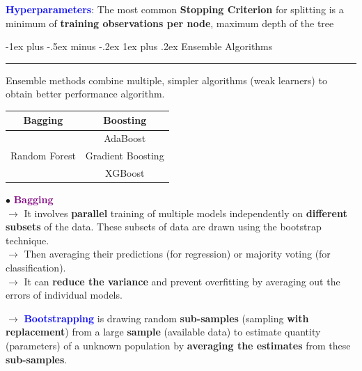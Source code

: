\documentclass[letterpaper, 10.5pt,landscape]{article}
\makeatletter
\renewcommand{\subsubsection}{\@startsection{subsubsection}{3}{0mm}%
                                {-1ex plus -.5ex minus -.2ex}%
                                {1ex plus .2ex}%
                                {\normalfont\small\bfseries}}
\makeatother
\begin{document}
\begin{multicols*}{3}
\vspace{3pt}
\textbf{\textcolor{blue}{Hyperparameters}}:  The most common \textbf{Stopping Criterion} for splitting is a minimum of \textbf{training observations per node},  maximum depth of the tree 




\subsubsection{Ensemble Algorithms} {\color{teal}\hrule height 0.5pt} \smallskip

Ensemble methods combine multiple, simpler algorithms (weak learners) to obtain better performance algorithm.
\vspace{-5pt}
\begin{center}
        \footnotesize
        \begin{tabular}{ c|c }
           \textbf{Bagging} & \textbf{Boosting} \\
           \hline
          & AdaBoost \\
          Random Forest & Gradient Boosting \\
          & XGBoost \\
        \end{tabular}
\end{center}
\vspace{-5pt}

$\bullet$ \textbf{\textcolor{purple}{Bagging}} \\
$\rightarrow$ It involves \textbf{parallel} training of multiple models independently on \textbf{different subsets} of the data. These subsets of data are drawn using the bootstrap technique. \\
$\rightarrow$ Then averaging their predictions (for regression) or majority voting (for classification). \\
$\rightarrow$ It can \textbf{reduce the variance} and prevent overfitting by averaging out the errors of individual models.

\vspace{3pt}
$\rightarrow$ \textbf{\textcolor{blue}{Bootstrapping}} is drawing random \textbf{sub-samples} (sampling \textbf{with replacement}) from a large \textbf{sample} (available data) to estimate quantity (parameters) of a unknown population by \textbf{averaging the estimates} from these \textbf{sub-samples}. \\










\end{multicols*}
\end{document}
